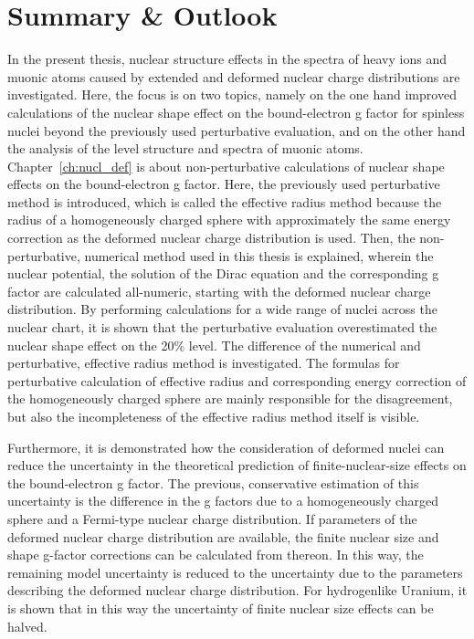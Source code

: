 \chapter*{Summary \& Outlook}
\label{ch:conclusion}

In the present thesis, nuclear structure effects in the spectra of heavy ions and muonic atoms caused by extended and deformed nuclear charge distributions are investigated. 
Here, the focus is on two topics, namely on the one hand improved calculations of the nuclear shape effect on the bound-electron g factor for spinless nuclei beyond the previously used perturbative evaluation, and on the other hand the analysis of the level structure and spectra of muonic atoms.\\[0.3cm]

Chapter~\ref{ch:nucl_def} is about non-perturbative calculations of nuclear shape effects on the bound-electron g factor. Here, the previously used perturbative method is introduced, which is called the effective radius method because the radius of a homogeneously charged sphere with approximately the same energy correction as the deformed nuclear charge distribution is used. 
Then, the non-perturbative, numerical method used in this thesis is explained, wherein the nuclear potential, the solution of the Dirac equation and the corresponding g factor are calculated all-numeric, starting with the deformed nuclear charge distribution. By performing calculations for a wide range of nuclei across the nuclear chart, it is shown that the perturbative evaluation overestimated the nuclear shape effect on the 20\% level. The difference of the numerical and perturbative, effective radius method is investigated. The formulas for perturbative calculation of effective radius and corresponding energy correction of the homogeneously charged sphere are mainly responsible for the disagreement, but also the incompleteness of the effective radius method itself is visible.

Furthermore, it is demonstrated how the consideration of deformed nuclei can reduce the uncertainty in the theoretical prediction of finite-nuclear-size effects on the bound-electron g factor. The previous, conservative estimation of this uncertainty is the difference in the g factors due to a homogeneously charged sphere and a Fermi-type nuclear charge distribution. If parameters of the deformed nuclear charge distribution are available, the finite nuclear size and shape g-factor corrections can be calculated from thereon. In this way, the remaining model uncertainty is reduced to the uncertainty due to the parameters describing the deformed nuclear charge distribution. For hydrogenlike Uranium, it is shown that in this way the uncertainty of finite nuclear size effects can be halved.\\ 

